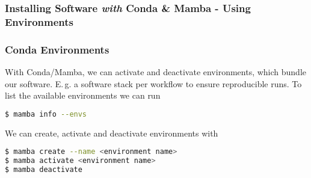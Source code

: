 \begin{frame}[fragile]
  \frametitle{Installing Software \emph{with} Conda \& Mamba - Using Environments}
\end{frame}


\begin{frame}[fragile]
  \frametitle{Conda Environments}
  With Conda/Mamba, we can activate and deactivate environments, which bundle our software. E.\,g. a software stack per workflow to ensure reproducible runs.
    \pause
  To list the available environments we can run
  \begin{lstlisting}[language=Bash, style=Shell]
$ mamba info --envs
  \end{lstlisting}
  We can create, activate and deactivate environments with
  \begin{lstlisting}[language=Bash, style=Shell]
$ mamba create --name <environment name>
$ mamba activate <environment name>
$ mamba deactivate
  \end{lstlisting}
\end{frame}




